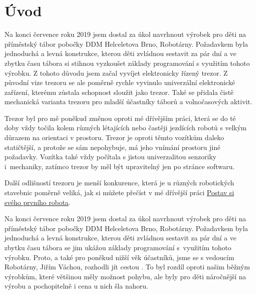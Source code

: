 \chapter*{Úvod}

Na konci července roku 2019 jsem dostal za úkol navrhnout výrobek pro děti na příměstský tábor pobočky DDM Helceletova Brno, Robotárny. %
 Poža\-dav\-kem 
byla jednoduchá a levná konstrukce, kterou děti zvládnou sestavit za pár dní a ve zbytku času tábora si stihnou vyzkoušet základy programování 
s využitím tohoto výrobku. Z tohoto důvodu jsem začal vyvíjet elektronicky řízený trezor. Z původní vize trezoru se ale poměrně rychle vyvinulo
univerzální elektronické zařízení, kterému zůstala schopnost sloužit jako trezor. Také se přidala čistě mechanická varianta trezoru pro mladší účastníky táborů a volnočasových aktivit.

Trezor byl pro mě poněkud změnou oproti mé dřívějším práci, která se do té doby vždy točila kolem různých létajících nebo častěji jezdících robotů s velkým důrazem na orientaci v prostoru.
Trezor je oproti těmto vozítkům daleko statičtější, a protože se sám nepohybuje, má jeho vnímání prostoru jiné požadavky. Vozítka také vždy počítala s jistou univerzalitou senzoriky i~mechaniky,
zatímco trezor by měl být upravitelný jen po stránce softwaru. 

Další odlišností trezoru je menší konkurence, která je u různých robotických stavebnic poměrně veliká, jak si můžete přečíst 
v mé dřívější práci \href{https://github.com/TVavrinec/SOC-text/blob/master/SOČ.pdf}{Postav si svého prvního robota}.





Na konci července roku 2019 jsem dostal za úkol navrhnout výrobek pro děti na příměstský tábor
pobočky DDM Helceletova Brno, Robotárny. 
Poža\-dav\-kem byla jednoduchá a levná konstrukce,
kterou děti zvládnou sestavit za pár dní a ve zbytku času tábora se jim ukážou základy programování
s~využitím tohoto výrobku. Proto, a také pro poněkud nižší věk účastníků, jsme se s vedoucím 
Robotárny, Jiřím Váchou, rozhodli jít cestou . To byl rozdíl oproti našim běžným 
výrobkům, které většinou měly možnost pohybu, ale byly pro děti náročnější na výrobu
a pochopitelně i cena u nich šla nahoru.


